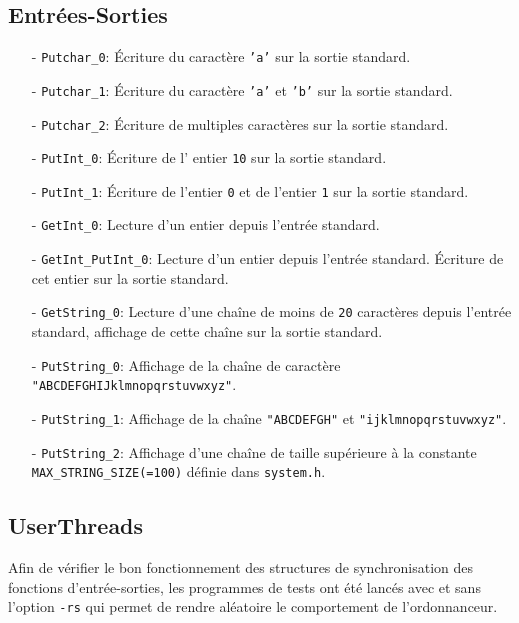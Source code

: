 \documentclass[11pt]{article}
\begin{document}
\subsection{Entrées-Sorties}
\begin{itemize}
\item[-] \texttt{Putchar\_0}: Écriture du caractère \texttt{'a'} sur la sortie standard.
\item[-] \texttt{Putchar\_1}: Écriture du caractère \texttt{'a'} et \texttt{'b'} sur la sortie standard.
\item[-] \texttt{Putchar\_2}: Écriture de multiples caractères sur la sortie standard.
\item[-] \texttt{PutInt\_0}: Écriture de l' entier \texttt{10} sur la sortie standard.
\item[-] \texttt{PutInt\_1}: Écriture de l'entier \texttt{0} et de l'entier \texttt{1} sur la sortie standard.
\item[-] \texttt{GetInt\_0}: Lecture d'un entier depuis l'entrée standard.
\item[-] \texttt{GetInt\_PutInt\_0}:
  Lecture d'un entier depuis l'entrée standard.
  Écriture de cet entier sur la sortie standard.
\item[-] \texttt{GetString\_0}: Lecture d'une chaîne de moins de \texttt{20} caractères depuis l'entrée standard, affichage de cette chaîne sur la sortie standard.
\item[-] \texttt{PutString\_0}: Affichage de la chaîne de caractère \texttt{"ABCDEFGHIJklmnopqrstuvwxyz"}.
\item[-] \texttt{PutString\_1}: Affichage de la chaîne \texttt{"ABCDEFGH"} et \texttt{"ijklmnopqrstuvwxyz"}.
\item[-] \texttt{PutString\_2}:   Affichage d'une chaîne de taille supérieure à la
  constante \texttt{MAX\_STRING\_SIZE(=100)} définie dans \texttt{system.h}.
\end{itemize}

\subsection{UserThreads}
Afin de vérifier le bon fonctionnement des structures de synchronisation des fonctions d'entrée-sorties,
les programmes de tests ont été lancés avec et sans l'option \texttt{-rs} qui permet de rendre aléatoire le comportement de l'ordonnanceur.
\end{document}
